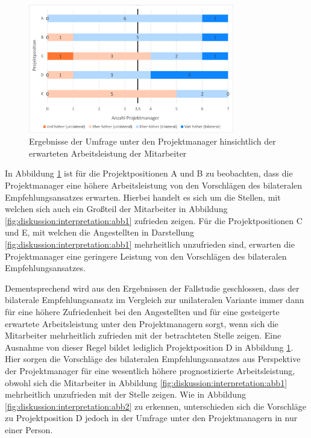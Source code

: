 \begin{figure}[h]
	\centering
	\includegraphics[width=0.8\textwidth]{gfx/ergebnisse-projektmanager-arbeitsleistung.png}	
	\caption{Ergebnisse der Umfrage unter den Projektmanager hinsichtlich der erwarteten Arbeitsleistung der Mitarbeiter}
	\label{fig:diskussion:interpretation:abb4}
\end{figure}

In Abbildung \ref{fig:diskussion:interpretation:abb4} ist für die Projektpositionen A und B zu beobachten, dass die Projektmanager eine höhere Arbeitsleistung von den Vorschlägen des bilateralen Empfehlungsansatzes erwarten. Hierbei handelt es sich um die Stellen, mit welchen sich auch ein Großteil der Mitarbeiter in Abbildung \ref{fig:diskussion:interpretation:abb1} zufrieden zeigen. Für die Projektpositionen C und E, mit welchen die Angestellten in Darstellung \ref{fig:diskussion:interpretation:abb1} mehrheitlich unzufrieden sind, erwarten die Projektmanager eine geringere Leistung von den Vorschlägen des bilateralen Empfehlungsansatzes.

Dementsprechend wird aus den Ergebnissen der Fallstudie geschlossen, dass der bilaterale Empfehlungsansatz im Vergleich zur unilateralen Variante immer dann für eine höhere Zufriedenheit bei den Angestellten und für eine gesteigerte erwartete Arbeitsleistung unter den Projektmanagern sorgt, wenn sich die Mitarbeiter mehrheitlich zufrieden mit der betrachteten Stelle zeigen. Eine Ausnahme von dieser Regel bildet lediglich Projektposition D in Abbildung \ref{fig:diskussion:interpretation:abb4}. Hier sorgen die Vorschläge des bilateralen Empfehlungsansatzes aus Perspektive der Projektmanager für eine wesentlich höhere prognostizierte Arbeitsleistung, obwohl sich die Mitarbeiter in Abbildung \ref{fig:diskussion:interpretation:abb1} mehrheitlich unzufrieden mit der Stelle zeigen. Wie in Abbildung \ref{fig:diskussion:interpretation:abb2} zu erkennen, unterschieden sich die Vorschläge zu Projektposition D jedoch in der Umfrage unter den Projektmanagern in nur einer Person.

